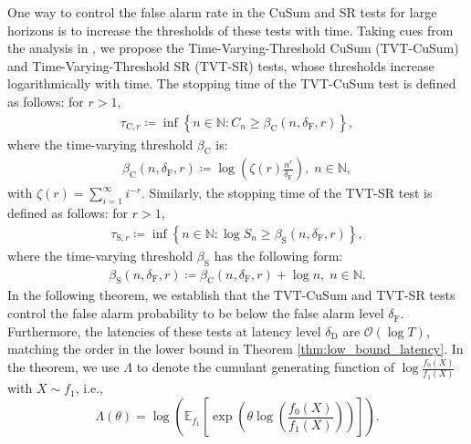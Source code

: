 \documentclass[12pt]{interact}
\newcommand{\lp}{\left(}
\newcommand{\rp}{\right)}
\newcommand{\lb}{\left[}
\newcommand{\rb}{\right]}
\newcommand{\lbp}{\left\{}
\newcommand{\rbp}{\right\}}
\newcommand{\mcal}{\mathcal}
\newcommand{\mrm}{\mathrm}
\newcommand{\mbb}{\mathbb}
\newcommand{\E}{\mathbb{E}}
\theoremstyle{plain}
\newcommand{\vvv}[1]{{\color{red}{#1}}}
\begin{document}
One way to control the false alarm rate in the CuSum and SR tests for large horizons is to increase the thresholds of these tests with time. Taking cues from the analysis in  \citep{kaufmann2021mixture, besson2022efficient}, we propose the Time-Varying-Threshold CuSum (TVT-CuSum) and Time-Varying-Threshold SR (TVT-SR) tests, whose thresholds increase logarithmically with time. The stopping time of the TVT-CuSum test is defined as follows: for $r > 1$,
%
\begin{align}\label{eq:TVT-CuSum_tau}
    \tau_{\mrm{C}, r} \coloneqq \inf \lbp n \in \mbb{N}: C_{n} \geq \beta_{\mrm{C}} \lp n, \delta_{\mrm{F}}, r \rp \rbp,
\end{align}
%
where the time-varying threshold $\beta_{\mrm{C}}$ is:
%
\begin{align}\label{eq:TVT-CuSum_thres}
    \beta_{\mrm{C}} \lp n, \delta_{\mrm{F}}, r \rp \coloneqq \log\lp \zeta \lp r\rp \frac{n^{r}}{\delta_{\mrm{F}}} \rp,\; n \in \mbb{N},
\end{align}
%
with $\zeta \lp r \rp = \sum_{i = 1}^{\infty} i^{-r}$. Similarly, the stopping time of the TVT-SR test is defined as follows: for $r > 1$,
%
\begin{align}\label{eq:TVT-SR_tau}
    \tau_{\mrm{S}, r} \coloneqq \inf \lbp n \in \mbb{N}: \log S_{n} \geq \beta_{\mrm{S}} \lp n, \delta_{\mrm{F}}, r \rp \rbp,
\end{align}
%
where the time-varying threshold $\beta_{\mrm{S}}$ has the following form:
%
\begin{align}\label{eq:TVT-SR_thres}
    \beta_{\mrm{S}} \lp n, \delta_{\mrm{F}}, r \rp \coloneqq \beta_{\mrm{C}} \lp n, \delta_{\mrm{F}}, r \rp + \log n,\; n \in \mbb{N}.
\end{align}
%
In the following theorem, we establish that the TVT-CuSum and TVT-SR tests control the false alarm probability to be below the false alarm level $\delta_{\mrm{F}}$. Furthermore, the latencies of these tests at latency level $\delta_{\mrm{D}}$ are $\mcal{O}\lp \log T \rp$, matching the order in the lower bound in Theorem \ref{thm:low_bound_latency}. In the theorem, we use $\Lambda$ to denote the cumulant generating function of $\log \frac{f_{0} \lp X \rp}{f_{1} \lp X \rp}$ with $X \sim f_{1}$, i.e.,
%
\begin{equation} \label{eq:cumulant}
\Lambda\lp\theta\rp=\log\lp\E_{f_{1}}\lb\exp\lp\theta\log\lp\frac{f_{0}\lp X\rp}{f_{1}\lp X\rp}\rp\rp\rb\rp.
\end{equation}
\end{document}
